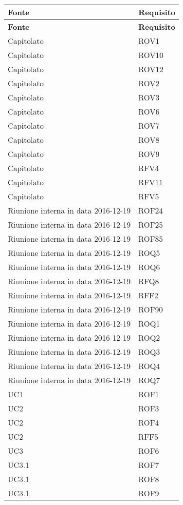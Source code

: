 \documentclass[../AnalisiDeiRequisiti_v3.0.0.tex]{subfiles}
\begin{document}
\begin{longtable}{p{4cm}!{\VRule[1pt]}p{4cm}}
\color{white} \textbf{Fonte} & \color{white} \textbf{Requisito} \\ 
\endfirsthead 
{} 
\color{white} \textbf{Fonte} & \color{white} \textbf{Requisito} \\ 
\endhead 
Capitolato & ROV1 \\
Capitolato & ROV10 \\
Capitolato & ROV12 \\
Capitolato & ROV2 \\
Capitolato & ROV3 \\
Capitolato & ROV6 \\
Capitolato & ROV7 \\
Capitolato & ROV8 \\
Capitolato & ROV9 \\
Capitolato & RFV4 \\
Capitolato & RFV11 \\
Capitolato & RFV5 \\
Riunione interna in data 2016-12-19 & ROF24 \\
Riunione interna in data 2016-12-19 & ROF25 \\
Riunione interna in data 2016-12-19 & ROF85 \\
Riunione interna in data 2016-12-19 & ROQ5 \\
Riunione interna in data 2016-12-19 & ROQ6 \\
Riunione interna in data 2016-12-19 & RFQ8 \\
Riunione interna in data 2016-12-19 & RFF2 \\
Riunione interna in data 2016-12-19 & ROF90 \\
Riunione interna in data 2016-12-19 & ROQ1 \\
Riunione interna in data 2016-12-19 & ROQ2 \\
Riunione interna in data 2016-12-19 & ROQ3 \\
Riunione interna in data 2016-12-19 & ROQ4 \\
Riunione interna in data 2016-12-19 & ROQ7 \\
UC1 & ROF1 \\
UC2 & ROF3 \\
UC2 & ROF4 \\
UC2 & RFF5 \\
UC3 & ROF6 \\
UC3.1 & ROF7 \\
UC3.1 & ROF8 \\
UC3.1 & ROF9 \\

\end{longtable}
\end{document}
